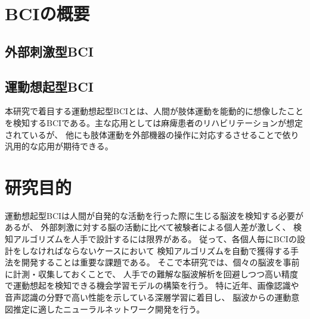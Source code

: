 \section{BCIの概要}
\subsection{外部刺激型BCI}
\subsection{運動想起型BCI}
本研究で着目する運動想起型BCIとは、人間が肢体運動を能動的に想像したことを検知するBCIである。主な応用としては麻痺患者のリハビリテーションが想定されているが、
他にも肢体運動を外部機器の操作に対応するさせることで依り汎用的な応用が期待できる。

\section{研究目的}
運動想起型BCIは人間が自発的な活動を行った際に生じる脳波を検知する必要があるが、
外部刺激に対する脳の活動に比べて被験者による個人差が激しく、
検知アルゴリズムを人手で設計するには限界がある。
従って、各個人毎にBCIの設計をしなければならないケースにおいて
検知アルゴリズムを自動で獲得する手法を開発することは重要な課題である。
そこで本研究では、個々の脳波を事前に計測・収集しておくことで、
人手での難解な脳波解析を回避しつつ高い精度で運動想起を検知できる機会学習モデルの構築を行う。
特に近年、画像認識や音声認識の分野で高い性能を示している深層学習に着目し、
脳波からの運動意図推定に適したニューラルネットワーク開発を行う。